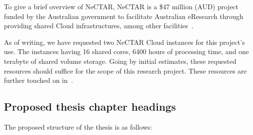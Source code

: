 \documentclass[a4paper,11pt]{article}
\begin{document}
To give a brief overview of NeCTAR, NeCTAR is a \$47 million (AUD) project funded by the Australian government to
facilitate Australian eResearch through providing shared Cloud infrastructures, among other
facilities~\cite{sinnott_towards_2011}.

As of writing, we have requested two NeCTAR Cloud instances for this project's use. The instances having 16 shared
cores, 6400 hours of processing time, and one terabyte of shared volume storage. Going by initial estimates, these
requested resources should suffice for the scope of this research project. These resources are further touched on
in~.


\subsection{Proposed thesis chapter headings} %
\label{sub:proposed_thesis_chapter_headings}

The proposed structure of the thesis is as follows:
\end{document}
